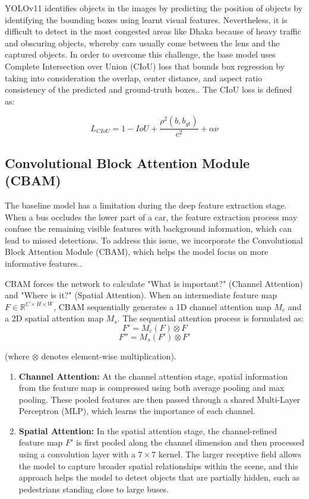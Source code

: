 \documentclass[sigconf]{acmart}
\begin{document}
YOLOv11 identifies objects in the images by predicting the position of objects by identifying the bounding boxes using learnt visual features. Nevertheless, it is difficult to detect in the most congested areas like Dhaka because of heavy traffic and obscuring objects, whereby cars usually come between the lens and the captured objects. In order to overcome this challenge, the base model uses Complete Intersection over Union (CIoU) loss that bounds box regression by taking into consideration the overlap, center distance, and aspect ratio consistency of the predicted and ground-truth boxes.. The CIoU loss is defined as:

\begin{equation}
L_{CIoU} = 1 - IoU + \frac{\rho^2(b, b_{gt})}{c^2} + \alpha \nu
\end{equation}


\subsection{Convolutional Block Attention Module (CBAM)}
The baseline model has a limitation during the deep feature extraction stage. When a bus occludes the lower part of a car, the feature extraction process may confuse the remaining visible features with background information, which can lead to missed detections. To address this issue, we incorporate the Convolutional Block Attention Module (CBAM)\cite{Woo2018CBAM}, which helps the model focus on more informative features..

CBAM forces the network to calculate "What is important?" (Channel Attention) and "Where is it?" (Spatial Attention). When an intermediate feature map $F \in \mathbb{R}^{C \times H \times W}$, CBAM sequentially generates a 1D channel attention map $M_{c}$ and a 2D spatial attention map $M_{s}$. The sequential attention process is formulated as:
\[
F' = M_{c}(F) \otimes F
\]
\[
F'' = M_{s}(F') \otimes F'
\]


(where $\otimes$ denotes element-wise multiplication).

\begin{enumerate}
    \item \textbf{Channel Attention:} At the channel attention stage, spatial information from the feature map is compressed using both average pooling and max pooling. These pooled features are then passed through a shared Multi-Layer Perceptron (MLP), which learns the importance of each channel.
    
    \item \textbf{Spatial Attention:} In the spatial attention stage, the channel-refined feature map $F'$ is first pooled along the channel dimension and then processed using a convolution layer with a $7 \times 7$ kernel. The larger receptive field allows the model to capture broader spatial relationships within the scene, and this approach helps the model to detect objects that are partially hidden, such as pedestrians standing close to large buses.

\end{enumerate}
\end{document}
